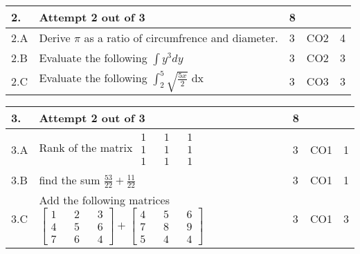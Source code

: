 \documentclass[12pt]{article}
\begin{document}
	\begin{longtable}{|L{1cm}|L{8cm}|C{1cm}|C{1cm}|C{1cm}|}\hline
	\bf2. & \bf{Attempt} \bf{2} \bf{out of} \bf{3} & \bf{8}  & & \\ \hline





		2.A &
	Derive $\pi$ as a ratio of circumfrence and diameter. \newline
			
	 &  3 & CO2 & 4\\ \hline
		2.B &
	Evaluate the following $\int y^{3} dy$ \newline
			
	 &  3 & CO2 & 3\\ \hline
		2.C &
	Evaluate the following $\int_{2}^{5}\sqrt{\frac{5x}{2}}$ dx \newline
			
	 &  3 & CO3 & 3\\ \hline
	\end{longtable}


\begin{longtable}{|L{1cm}|L{8cm}|C{1cm}|C{1cm}|C{1cm}|}\hline
	\bf3. & \bf{Attempt} \bf{2} \bf{out of} \bf{3} & \bf{8}  & & \\ \hline





		3.A &
	Rank of the matrix  $\begin{matrix} 1 && 1 &&1 \\ 1 && 1 && 1\\ 1 && 1 && 1 \end{matrix}$ \newline
			
	 &  3 & CO1 & 1\\ \hline
		3.B &
	find the sum $\frac{53}{22}+\frac{11}{22}$ \newline
			
	 &  3 & CO1 & 1\\ \hline
		3.C &
	Add the following matrices $\begin{bmatrix} 1 && 2 && 3\\ 4 && 5 && 6\\ 7 && 6 && 4 \end{bmatrix}+\begin{bmatrix} 4 && 5 && 6\\ 7 && 8 && 9 \\ 5 && 4 && 4 \end{bmatrix}$ \newline
			
	 &  3 & CO1 & 3\\ \hline
	\end{longtable}
\end{document}

